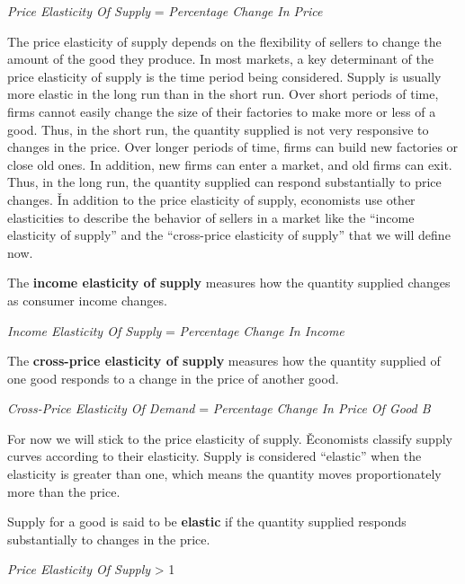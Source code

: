 \bse
\textit{Price Elasticity Of Supply} = 
{\textit{Percentage Change In Price}}
\ese
\ed

The price elasticity of supply depends on the flexibility of sellers to change the amount of the good they produce.
In most markets, a key determinant of the price elasticity of supply is the time period being considered. Supply is
usually more elastic in the long run than in the short run. Over short periods of time, firms cannot easily change
the size of their factories to make more or less of a good. Thus, in the short run, the quantity supplied is not very
responsive to changes in the price. Over longer periods of time, firms can build new factories or close old ones. In
addition, new firms can enter a market, and old firms can exit. Thus, in the long run, the quantity supplied can
respond substantially to price changes. \v

In addition to the price elasticity of supply, economists use other elasticities to describe the behavior of sellers
in a market like the ``income elasticity of supply'' and the ``cross-price elasticity of supply'' that we will define
now.

The \textbf{income elasticity of supply} measures how the quantity supplied changes as consumer income changes.

\bse
\textit{Income Elasticity Of Supply} = 
{\textit{Percentage Change In Income}}
\ese
\ed

The \textbf{cross-price elasticity of supply} measures how the quantity supplied of one good responds to a change in the
price of another good.

\bse
\textit{Cross-Price Elasticity Of Demand} = 
{\textit{Percentage Change In Price Of Good B}}
\ese
\ed

For now we will stick to the price elasticity of supply. \v

Economists classify supply curves according to their elasticity. Supply is considered ``elastic'' when the elasticity
is greater than one, which means the quantity moves proportionately more than the price.

Supply for a good is said to be \textbf{elastic} if the quantity supplied responds substantially to changes in the price.

\bse
\textit{Price Elasticity Of Supply} > 1
\ese
\ed

